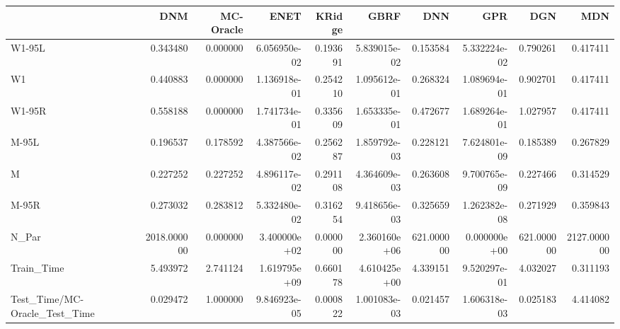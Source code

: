 \begin{tabular}{lrrrrrrrrr}
\toprule
{} &          DNM &  MC-Oracle &          ENET &    KRidge &          GBRF &         DNN &           GPR &         DGN &          MDN \\
\midrule
W1-95L                        &     0.343480 &   0.000000 &  6.056950e-02 &  0.193691 &  5.839015e-02 &    0.153584 &  5.332224e-02 &    0.790261 &     0.417411 \\
W1                            &     0.440883 &   0.000000 &  1.136918e-01 &  0.254210 &  1.095612e-01 &    0.268324 &  1.089694e-01 &    0.902701 &     0.417411 \\
W1-95R                        &     0.558188 &   0.000000 &  1.741734e-01 &  0.335609 &  1.653335e-01 &    0.472677 &  1.689264e-01 &    1.027957 &     0.417411 \\
M-95L                         &     0.196537 &   0.178592 &  4.387566e-02 &  0.256287 &  1.859792e-03 &    0.228121 &  7.624801e-09 &    0.185389 &     0.267829 \\
M                             &     0.227252 &   0.227252 &  4.896117e-02 &  0.291108 &  4.364609e-03 &    0.263608 &  9.700765e-09 &    0.227466 &     0.314529 \\
M-95R                         &     0.273032 &   0.283812 &  5.332480e-02 &  0.316254 &  9.418656e-03 &    0.325659 &  1.262382e-08 &    0.271929 &     0.359843 \\
N\_Par                         &  2018.000000 &   0.000000 &  3.400000e+02 &  0.000000 &  2.360160e+06 &  621.000000 &  0.000000e+00 &  621.000000 &  2127.000000 \\
Train\_Time                    &     5.493972 &   2.741124 &  1.619795e+09 &  0.660178 &  4.610425e+00 &    4.339151 &  9.520297e-01 &    4.032027 &     0.311193 \\
Test\_Time/MC-Oracle\_Test\_Time &     0.029472 &   1.000000 &  9.846923e-05 &  0.000822 &  1.001083e-03 &    0.021457 &  1.606318e-03 &    0.025183 &     4.414082 \\
\bottomrule
\end{tabular}
